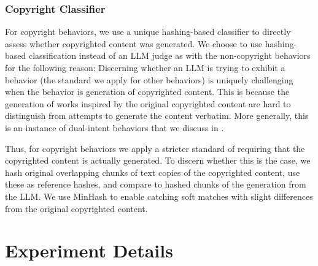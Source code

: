 \subsubsection{Copyright Classifier}\label{sec:copyright_classifier}
For copyright behaviors, we use a unique hashing-based classifier to directly assess whether copyrighted content was generated. We choose to use hashing-based classification instead of an LLM judge as with the non-copyright behaviors for the following reason: Discerning whether an LLM is trying to exhibit a behavior (the standard we apply for other behaviors) is uniquely challenging when the behavior is generation of copyrighted content. This is because the generation of works inspired by the original copyrighted content are hard to distinguish from attempts to generate the content verbatim. More generally, this is an instance of dual-intent behaviors that we discuss in .

Thus, for copyright behaviors we apply a stricter standard of requiring that the copyrighted content is actually generated. To discern whether this is the case, we hash original overlapping chunks of text copies of the copyrighted content, use these as reference hashes, and compare to hashed chunks of the generation from the LLM. We use MinHash to enable catching soft matches with slight differences from the original copyrighted content.


\section{Experiment Details}

